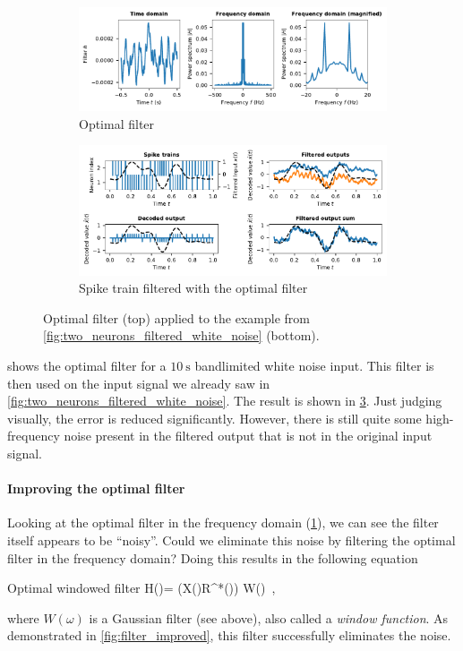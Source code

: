 \documentclass[10pt,letterpaper,oneside]{article}
\begin{document}
\begin{figure}
	\begin{subfigure}{\textwidth}
		\centering
		\includegraphics{media/optimal_filter.pdf}
		\caption{Optimal filter}
		\label{fig:optimal_filter}
	\end{subfigure}
	\begin{subfigure}{\textwidth}
		\centering
		\includegraphics{media/two_neurons_filtered_optimal_simple_small.pdf}
		\caption{Spike train filtered with the optimal filter}
		\label{fig:two_neurons_filtered_optimal_simple_small}
	\end{subfigure}
	\caption{Optimal filter (top) applied to the example from \cref{fig:two_neurons_filtered_white_noise} (bottom). }
\end{figure}

 shows the optimal filter for a $\SI{10}{\second}$ bandlimited white noise input. This filter is then used on the input signal we already saw in \cref{fig:two_neurons_filtered_white_noise}. The result is shown in \cref{fig:two_neurons_filtered_optimal_simple_small}. Just judging visually, the error is reduced significantly. However, there is still quite some high-frequency noise present in the filtered output that is not in the original input signal. 

\paragraph{Improving the optimal filter}
Looking at the optimal filter in the frequency domain (\cref{fig:optimal_filter}), we can see the filter itself appears to be \enquote{noisy}. Could we eliminate this noise by filtering the optimal filter in the frequency domain? Doing this results in the following equation
\begin{ImportantEqn}{Optimal windowed filter}
	H(\omega)= {{(X(\omega)R^*(\omega)) \ast W(\omega)} } \,,
	\label{eqn:optimal_windowed_filter}
\end{ImportantEqn}
where $W(\omega)$ is a Gaussian filter (see above), also called a \emph{window function}. As demonstrated in \cref{fig:filter_improved}, this filter successfully eliminates the noise.
\end{document}
